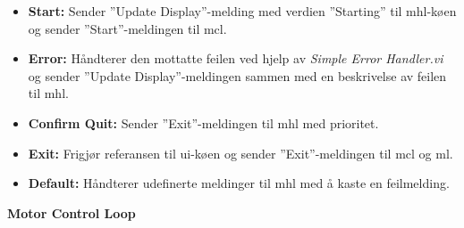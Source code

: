 \documentclass{ol-softwaremanual}
\begin{document}
\begin{itemize}
    \item \textbf{Start:} Sender ''Update Display''-melding med verdien ''Starting'' til \acrshort{mhl}-køen og sender ''Start''-meldingen til \acrshort{mcl}. 
    \item \textbf{Error:} Håndterer den mottatte feilen ved hjelp av \textit{Simple Error Handler.vi} og sender ''Update Display''-meldingen sammen med en beskrivelse av feilen til \acrshort{mhl}.   
    \item \textbf{Confirm Quit:} Sender ''Exit''-meldingen til \acrshort{mhl} med prioritet. 
    \item \textbf{Exit:} Frigjør referansen til \acrshort{ui}-køen og sender ''Exit''-meldingen til \acrshort{mcl} og \acrshort{ml}.
    \item \textbf{Default:} Håndterer udefinerte meldinger til \acrshort{mhl} med å kaste en feilmelding. 
\end{itemize}
\textbf{Motor Control Loop}
\end{document}

